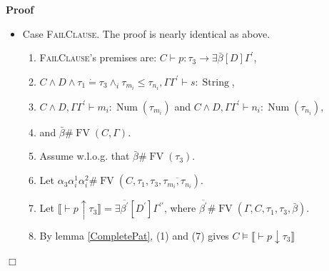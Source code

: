 \documentclass{article}
\newcommand{\tmname}[1]{\textsc{#1}}
\newcommand{\tmop}[1]{\ensuremath{\operatorname{#1}}}
\newenvironment{proof}{\noindent\textbf{Proof\ }}{\hspace*{\fill}$\Box$\medskip}
\begin{document}
\begin{proof}
\begin{itemize}
\begin{enumerate}
      \item By (8), (10), (14) and (17), we get $\overline{\mathcal{I}_i^1}
      \overline{\mathcal{I}_i^2} \mathcal{I}^3, C \wedge \alpha_3 \dot{=}
      \tau_3 \wedge_i \alpha^1_i \dot{=} \tau_{m_i}^{\prime} \wedge_i
      \alpha^2_i \dot{=} \tau_{n_i}^{\prime} \vDash \Phi$.
      
      \item By nonemptiness of the domains, from (18) we get the goal
      $\overline{\mathcal{I}_i^1} \overline{\mathcal{I}_i^2} \mathcal{I}^3, C
      \vDash \exists \alpha_3 \overline{\alpha^1_i \alpha^2_i} . \Phi$.
    \end{enumerate}
    \item Case {\tmname{FailClause}}. The proof is nearly identical as above.
    \begin{enumerate}
      \item {\tmname{FailClause}}'s premises are: $C \vdash p : \tau_3
      \longrightarrow \exists \bar{\beta} [D] \Gamma^{\prime}$,
      
      \item $C \wedge D \wedge \tau_1 \dot{=} \tau_3 \wedge_i \tau_{m_i} \leq
      \tau_{n_i}, \Gamma \Gamma^{\prime} \vdash s : \tmop{String}$,
      
      \item $C \wedge D, \Gamma \Gamma^{\prime} \vdash m_i : \tmop{Num}
      (\tau_{m_i})$ and $C \wedge D, \Gamma \Gamma^{\prime} \vdash n_i :
      \tmop{Num} (\tau_{n_i})$,
      
      \item and $\bar{\beta} \# \tmop{FV} (C, \Gamma)$.
      
      \item Assume w.l.o.g. that $\bar{\beta} \# \tmop{FV} (\tau_3)$.
      
      \item Let $\alpha_3 \alpha_i^1 \alpha_i^2 \# \tmop{FV} (C, \tau_1,
      \tau_3, \overline{\tau_{m_i}, \tau_{n_i}})$.
      
      \item Let $\llbracket \vdash p \uparrow \tau_3 \rrbracket = \exists
      \overline{\beta^{\prime}} [D^{\prime}] \Gamma^{\prime\prime}$, where
      $\overline{\beta^{\prime}} \# \tmop{FV} (\Gamma, C, \tau_1, \tau_3,
      \bar{\beta})$.
      
      \item By lemma \ref{CompletePat}, (1) and (7) gives $C \vDash \llbracket
      \vdash p \downarrow \tau_3 \rrbracket$
      

\end{enumerate}
\end{itemize}
\end{proof}
\end{document}
